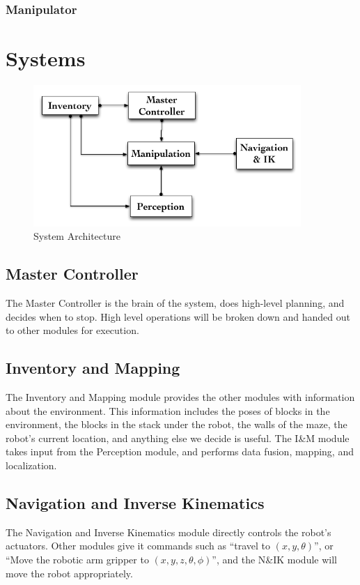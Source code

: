 \documentclass[letterpaper,11pt]{article}
\begin{document}
\subsubsection{Manipulator}


\section{Systems}
\begin{figure}[h]
\centering
 \includegraphics[width=4in]{images/System_Architecture}
\caption{System Architecture}
\end{figure}

\subsection{Master Controller}
The Master Controller is the brain of the system, does high-level planning, and decides when to stop.
High level operations will be broken down and handed out to other modules for execution.

\subsection{Inventory and Mapping}
The Inventory and Mapping module provides the other modules with information about the environment.
This information includes the poses of blocks in the environment,
the blocks in the stack under the robot,
the walls of the maze,
the robot's current location,
and anything else we decide is useful.
The I\&M module takes input from the Perception module, and performs data fusion, mapping, and localization.

\subsection{Navigation and Inverse Kinematics}
The Navigation and Inverse Kinematics module directly controls the robot's actuators.
Other modules give it commands such as ``travel to $(x, y, \theta)$'',
or ``Move the robotic arm gripper to $(x, y, z, \theta, \phi)$'',
and the N\&IK module will move the robot appropriately.
\end{document}
